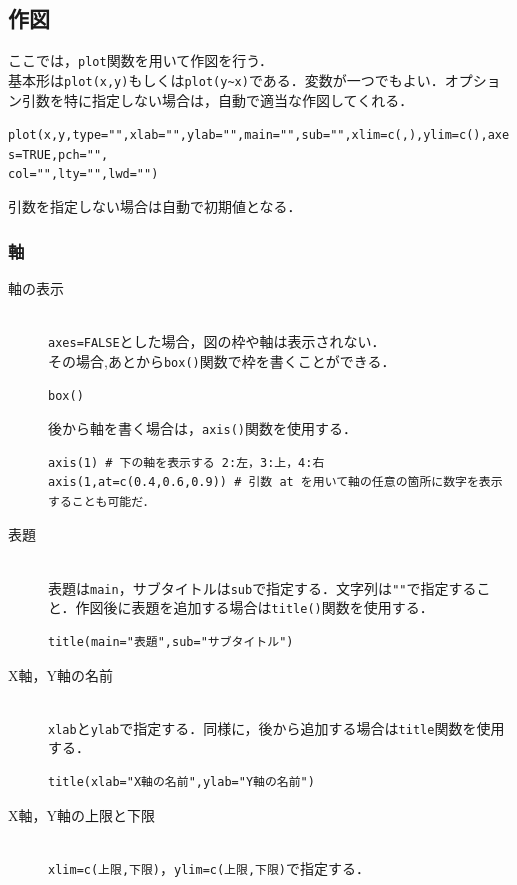 \subsection{作図}
ここでは，{\tt plot}関数を用いて作図を行う．\\
基本形は{\tt plot(x,y)}もしくは{\tt plot(y\verb+~+x)}である．変数が一つでもよい．オプション引数を特に指定しない場合は，自動で適当な作図してくれる．
\begin{screen}
\verb+plot(x,y,type="",xlab="",ylab="",main="",sub="",xlim=c(,),ylim=c(),axes=TRUE,pch="",+\\
\verb+col="",lty="",lwd="")+ 
\end{screen}
引数を指定しない場合は自動で初期値となる．
\subsubsection{軸}
\begin{description}
\item[軸の表示] \mbox{}\\
{\tt axes=FALSE}とした場合，図の枠や軸は表示されない．\\
その場合,あとから{\tt box()}関数で枠を書くことができる．
\begin{screen}
{\tt box()}
\end{screen}
後から軸を書く場合は，{\tt axis()}関数を使用する．
\begin{screen}
\begin{verbatim}
axis(1) # 下の軸を表示する 2:左，3:上，4:右
axis(1,at=c(0.4,0.6,0.9)) # 引数 at を用いて軸の任意の箇所に数字を表示することも可能だ．
\end{verbatim}
\end{screen}
\item[表題] \mbox{}\\
表題は{\tt main}，サブタイトルは{\tt sub}で指定する．文字列は\verb+""+で指定すること．作図後に表題を追加する場合は{\tt title()}関数を使用する．
\begin{screen}
\begin{verbatim}
title(main="表題",sub="サブタイトル")
\end{verbatim}
\end{screen}
\item[X軸，Y軸の名前] \mbox{}\\
{\tt xlab}と{\tt ylab}で指定する．同様に，後から追加する場合は{\tt title}関数を使用する．
\begin{screen}
\begin{verbatim}
title(xlab="X軸の名前",ylab="Y軸の名前")
\end{verbatim}
\end{screen}
\item[X軸，Y軸の上限と下限] \mbox{}\\
{\tt xlim=c(上限,下限)}，{\tt ylim=c(上限,下限)}で指定する．
\end{description}
